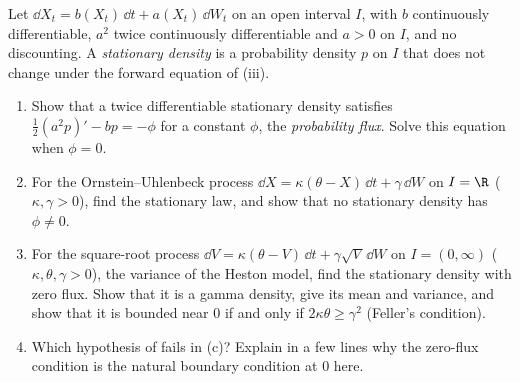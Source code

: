 \begin{exercise}\label{ex:sr-stationary}
\medium Let $\dd X_t=b(X_t)\,\dd t+a(X_t)\,\dd W_t$ on an open interval $I$, with $b$ continuously differentiable,
$a^2$ twice continuously differentiable and $a>0$ on $I$, and no discounting. A \emph{stationary density} is a
probability density $p$ on $I$ that does not change under the forward equation of
(iii).
\begin{enumerate}[label=(\alph*)]
  \item Show that a twice differentiable stationary density satisfies
    $\frac12(a^2p)'-bp=-\phi$ for a constant $\phi$, the \emph{probability flux}. Solve this equation when $\phi=0$.
  \item For the Ornstein--Uhlenbeck process $\dd X=\kappa(\theta-X)\,\dd t+\gamma\,\dd W$ on $I=\R$ ($\kappa,\gamma>0$), find the
    stationary law, and show that no stationary density has $\phi\neq0$.
  \item For the square-root process $\dd V=\kappa(\theta-V)\,\dd t+\gamma\sqrt V\,\dd W$ on $I=(0,\infty)$
    ($\kappa,\theta,\gamma>0$), the variance of the Heston model, find the stationary density with zero flux. Show
    that it is a gamma density, give its mean and variance, and show that it is bounded near $0$ if and only if
    $2\kappa\theta\ge\gamma^2$ (Feller's condition).
  \item Which hypothesis of  fails in (c)? Explain in a few lines why the zero-flux
    condition is the natural boundary condition at $0$ here.
\end{enumerate}
\end{exercise}

